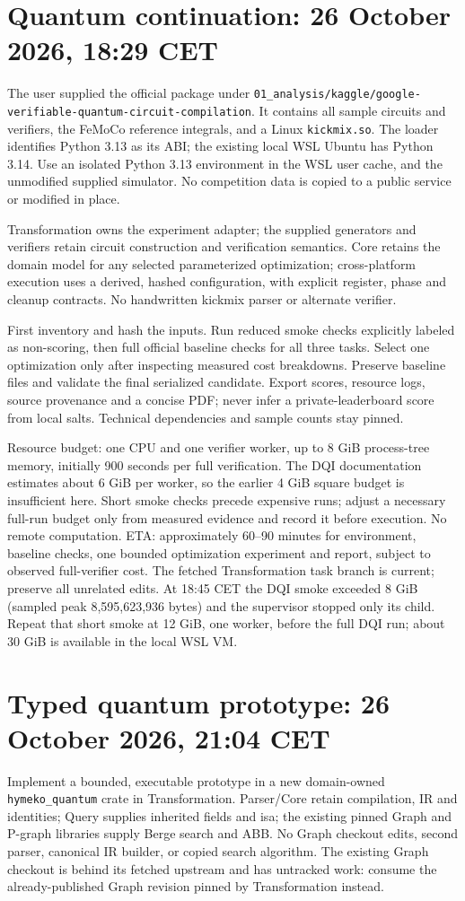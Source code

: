 \documentclass{article}
\begin{document}
\section*{Quantum continuation: 26 October 2026, 18:29 CET}
The user supplied the official package under
\texttt{01\_analysis/kaggle/google-verifiable-quantum-circuit-compilation}.
It contains all sample circuits and verifiers, the FeMoCo reference integrals,
and a Linux \texttt{kickmix.so}. The loader identifies Python 3.13 as its ABI;
the existing local WSL Ubuntu has Python 3.14. Use an isolated Python 3.13
environment in the WSL user cache, and the unmodified supplied simulator.
No competition data is copied to a public service or modified in place.

Transformation owns the experiment adapter; the supplied generators and verifiers
retain circuit construction and verification semantics. Core retains the domain
model for any selected parameterized optimization; cross-platform execution uses
a derived, hashed configuration, with explicit register, phase and cleanup
contracts. No handwritten kickmix parser or alternate verifier.

First inventory and hash the inputs. Run reduced smoke checks explicitly labeled
as non-scoring, then full official baseline checks for all three tasks. Select one
optimization only after inspecting measured cost breakdowns. Preserve baseline
files and validate the final serialized candidate. Export scores, resource logs,
source provenance and a concise PDF; never infer a private-leaderboard score from
local salts. Technical dependencies and sample counts stay pinned.

Resource budget: one CPU and one verifier worker, up to 8 GiB process-tree memory,
initially 900 seconds per full verification. The DQI documentation estimates about
6 GiB per worker, so the earlier 4 GiB square budget is insufficient here.
Short smoke checks precede expensive runs; adjust a necessary full-run budget only
from measured evidence and record it before execution. No remote computation.
ETA: approximately 60--90 minutes for environment, baseline checks, one bounded
optimization experiment and report, subject to observed full-verifier cost.
The fetched Transformation task branch is current; preserve all unrelated edits.
At 18:45 CET the DQI smoke exceeded 8 GiB (sampled peak 8,595,623,936 bytes)
and the supervisor stopped only its child. Repeat that short smoke at 12 GiB,
one worker, before the full DQI run; about 30 GiB is available in the local WSL VM.
\section*{Typed quantum prototype: 26 October 2026, 21:04 CET}
Implement a bounded, executable prototype in a new domain-owned
\texttt{hymeko\_quantum} crate in Transformation. Parser/Core retain compilation,
IR and identities; Query supplies inherited fields and isa; the existing pinned
Graph and P-graph libraries supply Berge search and ABB. No Graph checkout edits,
second parser, canonical IR builder, or copied search algorithm. The existing
Graph checkout is behind its fetched upstream and has untracked work: consume
the already-published Graph revision pinned by Transformation instead.
\end{document}

